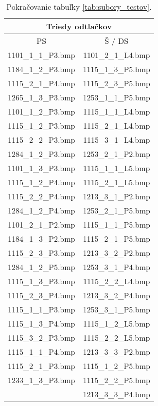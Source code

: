  \begin{table}
    \centering
    \caption{Pokračovanie tabuľky \ref{tab:subory_testov}.}
    \begin{tabular}{ | c | c | }
      \hline
      \multicolumn{2}{|c|}{Triedy odtlačkov}            \\
      \hline
      PS    & Š / DS     \\
      \hline
       1101\_1\_1\_P3.bmp & 1101\_2\_1\_L4.bmp \\
       1184\_1\_2\_P3.bmp & 1115\_1\_3\_P5.bmp \\
       1115\_2\_1\_P4.bmp & 1115\_2\_3\_P5.bmp \\
       1265\_1\_3\_P3.bmp & 1253\_1\_1\_P5.bmp \\
       1101\_1\_2\_P3.bmp & 1115\_1\_1\_L4.bmp \\
       1115\_1\_2\_P3.bmp & 1115\_2\_1\_L4.bmp \\
       1115\_2\_2\_P3.bmp & 1115\_3\_1\_L4.bmp \\
       1284\_1\_2\_P3.bmp & 1253\_2\_1\_P2.bmp \\
       1101\_1\_3\_P3.bmp & 1115\_1\_1\_L5.bmp \\
       1115\_1\_2\_P4.bmp & 1115\_2\_1\_L5.bmp \\
       1115\_2\_2\_P4.bmp & 1213\_3\_1\_P2.bmp \\
       1284\_1\_2\_P4.bmp & 1253\_2\_1\_P5.bmp \\
       1101\_2\_1\_P2.bmp & 1115\_1\_1\_P5.bmp \\
       1184\_1\_3\_P2.bmp & 1115\_2\_1\_P5.bmp \\
       1115\_2\_3\_P3.bmp & 1213\_3\_2\_P2.bmp \\
       1284\_1\_2\_P5.bmp & 1253\_3\_1\_P4.bmp \\
       1115\_1\_3\_P3.bmp & 1115\_2\_2\_L4.bmp \\
       1115\_2\_3\_P4.bmp & 1213\_3\_2\_P4.bmp \\
       1115\_1\_1\_P3.bmp & 1253\_3\_1\_P5.bmp \\
       1115\_1\_3\_P4.bmp & 1115\_1\_2\_L5.bmp \\
       1115\_3\_2\_P3.bmp & 1115\_2\_2\_L5.bmp \\
       1115\_1\_1\_P4.bmp & 1213\_3\_3\_P2.bmp \\
       1115\_2\_1\_P3.bmp & 1115\_1\_2\_P5.bmp \\
       1233\_1\_3\_P3.bmp & 1115\_2\_2\_P5.bmp \\
                          & 1213\_3\_3\_P4.bmp \\

\end{tabular}
\end{table}
